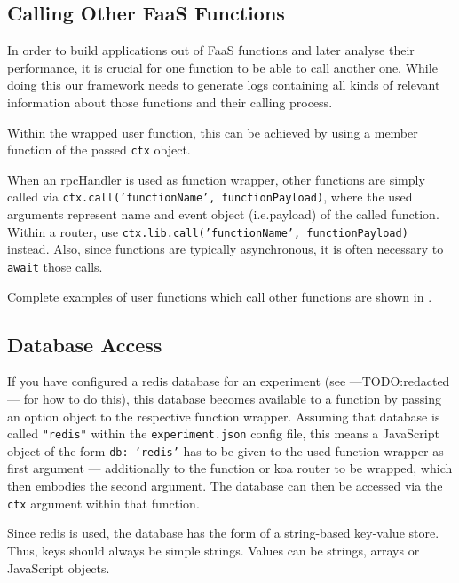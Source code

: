 \documentclass[../main.tex]{subfiles}
\begin{document}
\subsection{Calling Other FaaS Functions}\label{sub:functionCallingOther}

In order to build applications out of FaaS functions and later analyse their performance, it is crucial for one function to be able to call another one.
While doing this our framework needs to generate logs containing all kinds of relevant information about those functions and their calling process. 

Within the wrapped user function, this can be achieved by using a member function of the passed \texttt{ctx} object.

When an rpcHandler is used as function wrapper, other functions are simply called via
\texttt{ctx.call('functionName', functionPayload)},
where the used arguments represent name and event object (i.e.\@ payload) of the called function.
Within a router, use \texttt{ctx.lib.call('functionName', functionPayload)} instead.
Also, since functions are typically asynchronous, it is often necessary to \texttt{await} those calls.

Complete examples of user functions which call other functions are shown in 
.

\subsection{Database Access}\label{sub:functionDBAccess}

If you have configured a redis database for an experiment (see ---TODO:\@ redacted--- for how to do this),
this database becomes available to a function by passing an option object to the respective function wrapper.
Assuming that database is called \texttt{"redis"} within the \texttt{experiment.json} config file,
this means a JavaScript object of the form \texttt{{db: 'redis'}} has to be given to the used function wrapper
as first argument --- additionally to the function or koa router to be wrapped, which then embodies the second argument.
The database can then be accessed via the \texttt{ctx} argument within that function.

Since redis is used, the database has the form of a string-based key-value store. 
Thus, keys should always be simple strings. 
Values can be strings, arrays or JavaScript objects. 
\end{document}
